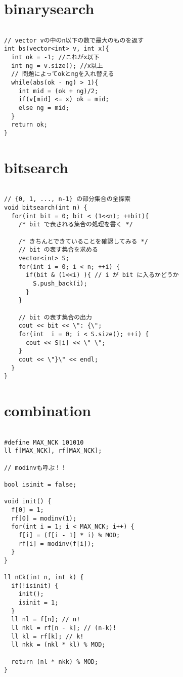 \documentclass[a4j,titlepage]{jarticle} %
\begin{document}
\color{white}
\section{binarysearch}
\color{black}
\begin{lstlisting}[caption=binarysearch]

// vector vの中のn以下の数で最大のものを返す
int bs(vector<int> v, int x){
  int ok = -1; //これがx以下 
  int ng = v.size(); //x以上 
  // 問題によってokとngを入れ替える
  while(abs(ok - ng) > 1){
    int mid = (ok + ng)/2;
    if(v[mid] <= x) ok = mid;
    else ng = mid;
  }
  return ok;
}

\end{lstlisting}

\color{white}
\section{bitsearch}
\color{black}
\begin{lstlisting}[caption=bitsearch]

// {0, 1, ..., n-1} の部分集合の全探索
void bitsearch(int n) {
  for(int bit = 0; bit < (1<<n); ++bit){
    /* bit で表される集合の処理を書く */
    
    /* きちんとできていることを確認してみる */
    // bit の表す集合を求める
    vector<int> S;
    for(int i = 0; i < n; ++i) {
      if(bit & (1<<i) ){ // i が bit に入るかどうか
        S.push_back(i);
      }
    }
    
    // bit の表す集合の出力
    cout << bit << \": {\";
    for(int  i = 0; i < S.size(); ++i) {
      cout << S[i] << \" \";
    }
    cout << \"}\" << endl;
  }
}

\end{lstlisting}

\color{white}
\section{combination}
\color{black}
\begin{lstlisting}[caption=combination]

#define MAX_NCK 101010
ll f[MAX_NCK], rf[MAX_NCK];

// modinvも呼ぶ！！

bool isinit = false;

void init() {
  f[0] = 1;
  rf[0] = modinv(1);
  for(int i = 1; i < MAX_NCK; i++) {
    f[i] = (f[i - 1] * i) % MOD;
    rf[i] = modinv(f[i]);
  }
}

ll nCk(int n, int k) {
  if(!isinit) {
    init();
    isinit = 1;
  }
  ll nl = f[n]; // n!
  ll nkl = rf[n - k]; // (n-k)!
  ll kl = rf[k]; // k!
  ll nkk = (nkl * kl) % MOD;

  return (nl * nkk) % MOD;
}

\end{lstlisting}
\end{document}

